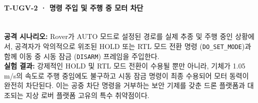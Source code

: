 

\paragraph{\textbf{T-UGV-2 · 명령 주입 및 주행 중 모터 차단}} ~\\
\textbf{공격 시나리오:} Rover가 AUTO 모드로 설정된 경로를 실제 추종 및 주행 중인 상황에서, 공격자가 악의적으로 위조된 HOLD 또는 RTL 모드 전환 명령 (\texttt{DO\_SET\_MODE})과 함께 이동 중 시동 잠금 (\texttt{DISARM}) 프레임을 주입한다.\\
\textbf{실험 결과:} 강제적인 HOLD 및 RTL 모드 전환이 수용될 뿐만 아니라, 기체가 1.05 m/s의 속도로 주행 중임에도 불구하고 시동 잠금 명령이 최종 수용되어 모터 동력이 완전히 차단된다. 이는 공중 차단 명령을 거부하는 보안 기제를 갖춘 드론 플랫폼과 대조되는 지상 로버 플랫폼 고유의 특수 취약점이다.\\
